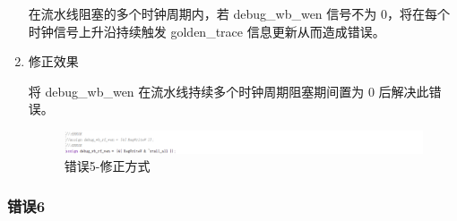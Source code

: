 \begin{enumerate}[(1)]
在流水线阻塞的多个时钟周期内，若 debug\_wb\_wen 信号不为 0，将在每个时钟信号上升沿持续触发 golden\_trace 信息更新从而造成错误。
    
    \item 修正效果

将 debug\_wb\_wen 在流水线持续多个时钟周期阻塞期间置为 0 后解决此错误。

\begin{figure}[H]
    \centering
    \includegraphics[width=\textwidth]{image/错误5-修正效果1.png}
    \caption{错误5-修正方式}
    \label{fig:错误5-修正效果1}
\end{figure}

\end{enumerate}


\subsubsection{错误6}

